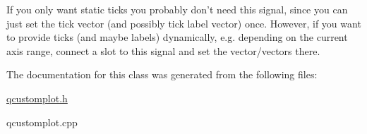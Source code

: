 If you only want static ticks you probably don't need this signal, since you can just set the tick vector (and possibly tick label vector) once. However, if you want to provide ticks (and maybe labels) dynamically, e.\-g. depending on the current axis range, connect a slot to this signal and set the vector/vectors there. 

The documentation for this class was generated from the following files\-:\begin{DoxyCompactItemize}
\item 
\hyperlink{qcustomplot_8h}{qcustomplot.\-h}\item 
qcustomplot.\-cpp\end{DoxyCompactItemize}
